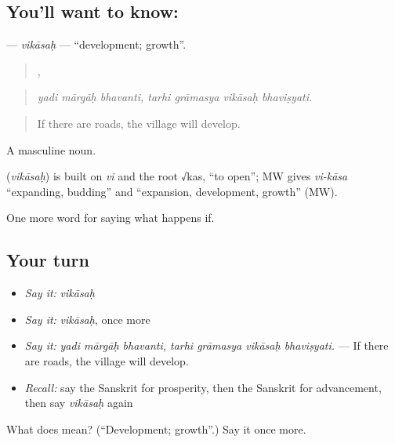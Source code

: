 \subsection*{You'll want to know: }
\textbf{} — \emph{vikāsaḥ} — \textquotedblleft{}development; growth\textquotedblright{}.

\begin{quote}
  ,    
\end{quote}

\begin{quote}
\emph{yadi mārgāḥ bhavanti, tarhi grāmasya vikāsaḥ bhaviṣyati.}
\end{quote}

\begin{quote}
If there are roads, the village will develop.
\end{quote}

A masculine noun.

\begin{cousinweb}
\textbf{} (\emph{vikāsaḥ}) is built on \emph{vi} and the root √kas, \textquotedblleft{}to open\textquotedblright{}; MW gives \emph{vi-kāsa} \textquotedblleft{}expanding, budding\textquotedblright{} and \textquotedblleft{}expansion, development, growth\textquotedblright{} (MW).
\end{cousinweb}

\begin{grammarlens}[title={What you've built}]
One more word for saying what happens if.
\end{grammarlens}

\subsection*{Your turn}
\begin{itemize}
\raggedright
  \item \emph{Say it:} \emph{vikāsaḥ}
  \item \emph{Say it:} \emph{vikāsaḥ}, once more
  \item \emph{Say it:} \emph{yadi mārgāḥ bhavanti, tarhi grāmasya vikāsaḥ bhaviṣyati.} — If there are roads, the village will develop.
  \item \emph{Recall:} say the Sanskrit for prosperity, then the Sanskrit for advancement, then say \emph{vikāsaḥ} again
\end{itemize}

\begin{tcolorbox}[breakable,colback=teal!4,colframe=teal!35!black,title={Before you move on}]
What does  mean? (\textquotedblleft{}Development; growth\textquotedblright{}.) Say it once more.
\end{tcolorbox}
